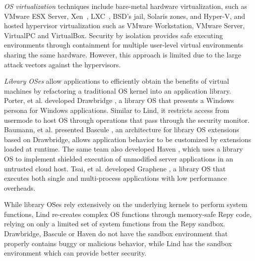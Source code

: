 \textit{OS virtualization}
techniques include
bare-metal hardware virtualization, such as VMware ESX Server, Xen~\cite{Xen-03},
LXC~\cite{LXC}, BSD's jail, Solaris zones, and Hyper-V, and
hosted hypervisor virtualization such as VMware
Workstation, VMware Server, VirtualPC and VirtualBox.
Security by isolation \cite{Qubes, Overshadow, SecureVM, HypSec}
provides safe executing environments through containment for multiple
user-level virtual environments sharing the same hardware.
However, this approach is limited due to
the large attack vectors against the hypervisors.

\textit{Library OSes}
allow applications to efficiently obtain the benefits of virtual machines
by refactoring a traditional OS kernel into an application library.
Porter, et al. developed Drawbridge \cite{Drawbridge-11},
a library OS 
that presents a Windows persona for %
Windows applications. Similar to Lind,
it restricts access from usermode to host OS through 
operations that pass through the security monitor.
%
%
Baumann, et al. presented Bascule \cite{Bascule}, an architecture for library OS extensions
based on Drawbridge, allows application behavior to be customized by
extensions loaded at runtime. The same team also developed Haven \cite{Haven},
which uses a library OS to implement
shielded execution of unmodified server applications
in an untrusted cloud host.
Tsai, et al. developed Graphene \cite{Graphene-14}, a library OS that
executes both single and
multi-process applications with low performance overheads.

While library OSes rely extensively on
the underlying kernels to perform system functions,
Lind re-creates complex OS functions through memory-safe Repy
code, relying on only a limited set of system functions from the Repy
sandbox. Drawbridge, Bascule or Haven
do not have the sandbox environment that properly contains
buggy or malicious behavior, while Lind has the sandbox environment which can provide better security. 
